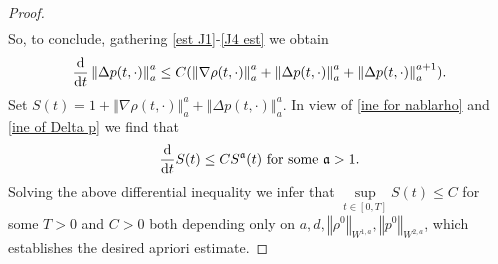 \documentclass[11pt,reqno]{amsart}
\numberwithin{equation}{section}
\def\dd{{\rm d}}
\begin{document}
\begin{proof}
\begin{align}
\end{align}
So, to conclude, gathering \eqref{est J1}-\eqref{J4 est} we obtain 
\begin{align}
\frac{\dd}{\dd t}\left\Vert \Delta p(t,\cdot)\right\Vert_{a}^{a}\leq C(\left\Vert \nabla \rho(t,\cdot)\right\Vert_{a}^{a} +\left\Vert \Delta p(t,\cdot)\right\Vert_{a}^{a}+\left\Vert \Delta p(t,\cdot)\right\Vert_{a}^{a+1}  ).  \label{ine of Delta p}    
\end{align}
Set $S(t)=1+\left\Vert \nabla \rho(t,\cdot)\right\Vert_{a}^{a}+\left\Vert \Delta p(t,\cdot)\right\Vert_{a}^{a}$. In view of  \eqref{ine for nablarho} and \eqref{ine of Delta p}  we find that 
\begin{align*}
\frac{\dd}{\dd t}S(t)\leq CS^{\mathfrak{a}}(t) \ \mbox{for some}\ \mathfrak{a}>1.      
\end{align*}
Solving the above differential inequality we infer that $\underset{t\in [0,T]}{\sup}S(t)\leq C$ for some $T>0$ and $C>0$ both depending only on $a,d,\left\Vert \rho^{0}\right\Vert_{W^{1,a}},\left\Vert p^{0}\right\Vert_{W^{2,a}}$, which establishes the desired apriori estimate. 
\end{proof}
\end{document}
